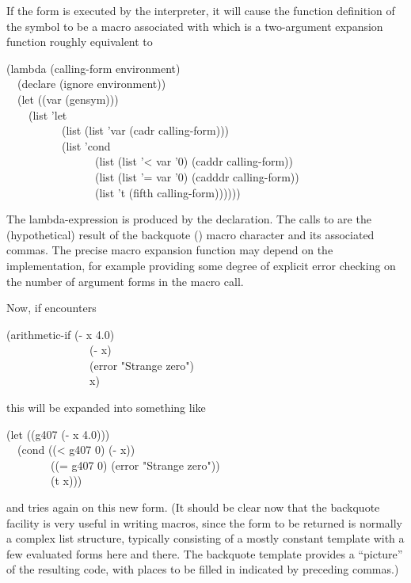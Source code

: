 \begin{defmac}
If the form is executed by the interpreter, it will cause the
function definition of the symbol 
to be a macro associated with which is
a two-argument expansion function roughly equivalent to
\begin{lisp}
(lambda (calling-form environment) \\
~~(declare (ignore environment)) \\
~~(let ((var (gensym))) \\
~~~~(list 'let \\
~~~~~~~~~~(list (list 'var (cadr calling-form))) \\
~~~~~~~~~~(list 'cond \\
~~~~~~~~~~~~~~~~(list (list '< var '0) (caddr calling-form)) \\
~~~~~~~~~~~~~~~~(list (list '= var '0) (cadddr calling-form)) \\
~~~~~~~~~~~~~~~~(list 't (fifth calling-form))))))
\end{lisp}
The lambda-expression is produced by the  declaration.
The calls to  are the (hypothetical) result of the backquote (\cd{{\Xbq}})
macro character and its associated commas.
The precise macro expansion function may depend on the implementation,
for example providing some degree of explicit error checking on the number
of argument forms in the macro call.

Now, if  encounters
\begin{lisp}
(arithmetic-if (- x 4.0) \\
~~~~~~~~~~~~~~~(- x) \\
~~~~~~~~~~~~~~~(error "Strange zero") \\
~~~~~~~~~~~~~~~x)
\end{lisp}
this will be expanded into something like
\begin{lisp}
(let ((g407 (- x 4.0))) \\
~~(cond ((< g407 0) (- x)) \\
~~~~~~~~((= g407 0) (error "Strange zero")) \\
~~~~~~~~(t x)))
\end{lisp}
and  tries again on this new form.
(It should be clear now that the backquote facility
is very useful in writing macros, since the form to be returned is
normally a complex list structure, typically consisting of a
mostly constant template with a few evaluated forms here and there.
The backquote template provides a ``picture'' of the resulting
code, with places to be filled in indicated by preceding commas.)


\end{defmac}
